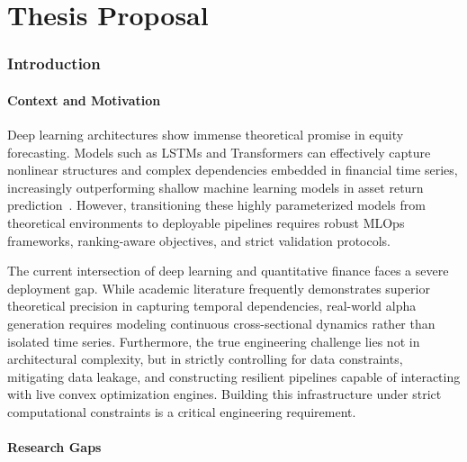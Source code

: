 \setcounter{page}{1}

\part{Thesis Proposal}

\section{Introduction}

\subsection*{Context and Motivation}

Deep learning architectures show immense theoretical promise in equity forecasting. Models such as \ac{LSTMs} and Transformers can effectively capture nonlinear structures and complex dependencies embedded in financial time series, increasingly outperforming shallow machine learning models in asset return prediction~\cite{Ellery2025}. However, transitioning these highly parameterized models from theoretical environments to deployable pipelines requires robust \ac{MLOps} frameworks, ranking-aware objectives, and strict validation protocols.

\medskip

The current intersection of deep learning and quantitative finance faces a severe deployment gap. While academic literature frequently demonstrates superior theoretical precision in capturing temporal dependencies, real-world alpha generation requires modeling continuous cross-sectional dynamics rather than isolated time series. Furthermore, the true engineering challenge lies not in architectural complexity, but in strictly controlling for data constraints, mitigating data leakage, and constructing resilient pipelines capable of interacting with live convex optimization engines. Building this infrastructure under strict computational constraints is a critical engineering requirement.

\subsection*{Research Gaps}

